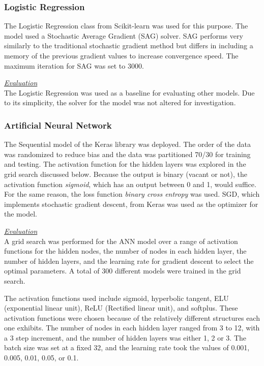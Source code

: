 \documentclass[letterpaper, 12 pt, conference]{ieeeconf}  %
\begin{document}
\subsubsection{Logistic Regression}
\mbox{} %

The Logistic Regression class from Scikit-learn was used for this purpose. The model used a Stochastic Average Gradient (SAG) solver. SAG performs very similarly to the traditional stochastic gradient method but differs in including a memory of the previous gradient values to increase convergence speed. The maximum iteration for SAG was set to 3000.

\textit{\underline{Evaluation}}\\
The Logistic Regression was used as a baseline for evaluating other models. Due to its simplicity, the solver for the model was not altered for investigation.

\subsubsection{Artificial Neural Network}
\mbox{} %

The Sequential model of the Keras library was deployed. The order of the data was randomized to reduce bias and the data was partitioned 70/30 for training and testing. The activation function for the hidden layers was explored in the grid search discussed below. Because the output is binary (vacant or not), the activation function \textit{sigmoid}, which has an output between 0 and 1, would suffice. For the same reason, the loss function \textit{binary cross entropy} was used. SGD, which implements stochastic gradient descent, from Keras was used as the optimizer for the model.

\textit{\underline{Evaluation}} \\
A grid search was performed for the ANN model over a range of activation functions for the hidden nodes, the number of nodes in each hidden layer, the number of hidden layers, and the learning rate for gradient descent to select the optimal parameters. A total of 300 different models were trained in the grid search.

The activation functions used include sigmoid, hyperbolic tangent, ELU (exponential linear unit), ReLU (Rectified linear unit), and softplus. These activation functions were chosen because of the relatively different structures each one exhibits. The number of nodes in each hidden layer ranged from 3 to 12, with a 3 step increment, and the number of hidden layers was either 1, 2 or 3. The batch size was set at a fixed 32, and the learning rate took the values of 0.001, 0.005, 0.01, 0.05, or 0.1.
\end{document}
